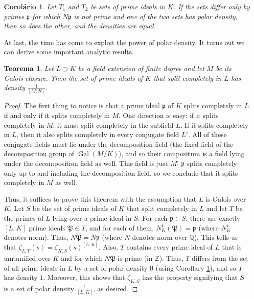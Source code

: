 \documentclass{article}
\DeclareMathOperator{\Gal}{Gal}
\newcommand{\QQ}{\mathbb{Q}}
\newcommand{\ZZ}{\mathbb{Z}}
\theoremstyle{plain}
\newtheorem{thm}{Teorema}
\newtheorem{cor}{Corolário}
\theoremstyle{remark}
\numberwithin{equation}{section}
\numberwithin{thm}{section}
\numberwithin{defn}{section}
\numberwithin{lemma}{section}
\numberwithin{axm}{section}
\begin{document}
\begin{cor} \label{4.4}
Let $T_1$ and $T_2$ be sets of prime ideals in $K$. If the sets differ only by primes $\mathfrak{p}$ for which $N\mathfrak{p}$ is not prime and one of the two sets has polar density, then so does the other, and the densities are equal. 
\end{cor}

At last, the time has come to exploit the power of polar density. It turns out we can derive some important analytic results.

\begin{thm} \label{4.5}
Let $L \supset K$ be a field extension of finite degree and let $M$ be its Galois closure. Then the set of prime ideals of $K$ that split completely in $L$ has density $\frac{1}{[M : K]}$. 
\end{thm}

\begin{proof}
The first thing to notice is that a prime ideal $\mathfrak{p}$ of $K$ splits completely in $L$ if and only if it splits completely in $M$. One direction is easy: if it splits completely in $M$, it must split completely in the subfield $L$. If it splits completely in $L$, then it also splits completely in every conjugate field $L'$. All of these conjugate fields must lie under the decomposition field (the fixed field of the decomposition group of $\Gal(M/K)$), and so their compositum is a field lying under the decomposition field as well. This field is just $M$! $\mathfrak{p}$ splits completely only up to and including the decomposition field, so we conclude that it splits completely in $M$ as well. 

Thus, it suffices to prove this theorem with the assumption that $L$ is Galois over $K$. Let $S$ be the set of prime ideals of $K$ that split completely in $L$ and let $T$ be the primes of $L$ lying over a prime ideal in $S$. For each $\mathfrak{p} \in S$, there are exactly $[L : K]$ prime ideals $\mathfrak{P} \in T$, and for each of them, $N_{K}^{L}(\mathfrak{P}) = \mathfrak{p}$ (where $N_{K}^{L}$ denotes norm). Thus, $N\mathfrak{P} = N\mathfrak{p}$ (where $N$ denotes norm over $\QQ$). This tells us that $\zeta_{L, T}(s) = \zeta_{K, S}(s)^{[L : K]}$. Also, $T$ contains every prime ideal of $L$ that is unramified over $K$ and for which $N\mathfrak{P}$ is prime (in $\ZZ$). Thus, $T$ differs from the set of all prime ideals in $L$ by a set of polar density $0$ (using Corollary \ref{4.4}), and so $T$ has density $1$. Moreover, this shows that $\zeta_{K, S}$ has the property signifying that $S$ is a set of polar density $\frac{1}{[L : K]}$, as desired.
\end{proof}
\end{document}
